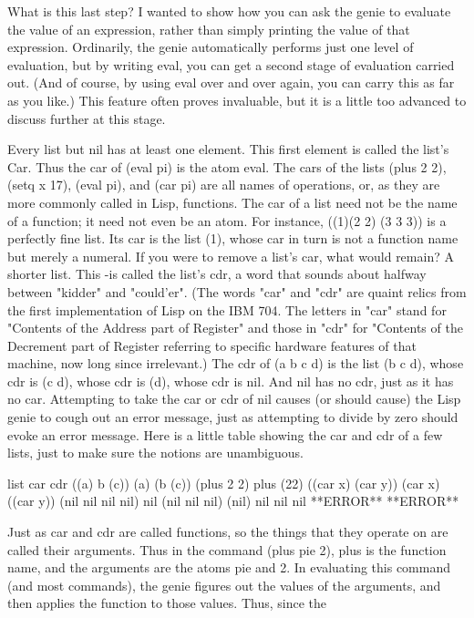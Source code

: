What is this last step? I wanted to show how you can ask the genie to evaluate the
value of an expression, rather than simply printing the value of that expression.
Ordinarily, the genie automatically performs just one level of evaluation, but by
writing eval, you can get a second stage of evaluation carried out. (And of course, by
using eval over and over again, you can carry this as far as you like.) This feature
often proves invaluable, but it is a little too advanced to discuss further at this stage.

         Every list but nil has at least one element. This first element is called the list's
Car. Thus the car of (eval pi) is the atom eval. The cars of the lists (plus 2 2), (setq x
17), (eval pi), and (car pi) are all names of operations, or, as they are more commonly
called in Lisp, functions. The car of a list need not be the name of a function; it need
not even be an atom. For instance, ((1)(2 2) (3 3 3)) is a perfectly fine list. Its car is
the list (1), whose car in turn is not a function name but merely a numeral.
         If you were to remove a list's car, what would remain? A shorter list. This -is
called the list's cdr, a word that sounds about halfway between "kidder" and
"could'er". (The words "car" and "cdr" are quaint relics from the first implementation
of Lisp on the IBM 704. The letters in "car" stand for "Contents of the Address part of
Register" and those in "cdr" for "Contents of the Decrement part of Register referring
to specific hardware features of that machine, now long since irrelevant.) The cdr of
(a b c d) is the list (b c d), whose cdr is (c d), whose cdr is (d), whose cdr is nil. And
nil has no cdr, just as it has no car. Attempting to take the car or cdr of nil causes (or
should cause) the Lisp genie to cough out an error message, just as attempting to
divide by zero should evoke an error message.
         Here is a little table showing the car and cdr of a few lists, just to make sure
the notions are unambiguous.

       list                    car                     cdr
       ((a) b (c))             (a)                     (b (c))
       (plus 2 2)              plus                    (22)
       ((car x) (car y))       (car x)                 ((car y))
       (nil nil nil nil)       nil                     (nil nil nil)
       (nil)                   nil                     nil
       nil                     **ERROR**               **ERROR**

        Just as car and cdr are called functions, so the things that they operate on are
called their arguments. Thus in the command (plus pie 2), plus is the function name,
and the arguments are the atoms pie and 2. In evaluating this command (and most
commands), the genie figures out the values of the arguments, and then applies the
function to those values. Thus, since the




